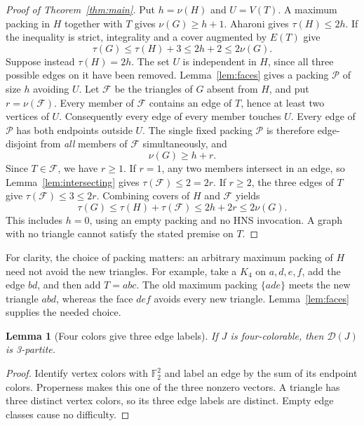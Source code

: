 \documentclass[11pt]{article}
\newtheorem{lemma}[theorem]{Lemma}
\theoremstyle{definition}\newtheorem{definition}[theorem]{Definition}
\theoremstyle{remark}\newtheorem{remark}[theorem]{Remark}
\newcommand{\D}{\mathcal D}
\begin{document}
\begin{proof}[Proof of Theorem~\ref{thm:main}]\leavevmode
Put $h=\nu(H)$ and $U=V(T)$. A maximum packing in $H$ together with
$T$ gives $\nu(G)\ge h+1$. Aharoni gives $\tau(H)\le2h$.
If the inequality is strict, integrality and a cover augmented by $E(T)$ give
\begin{equation}\label{eq:strict}
\tau(G)\le\tau(H)+3\le2h+2\le2\nu(G).
\end{equation}
Suppose instead $\tau(H)=2h$. The set $U$ is independent in $H$, since
all three possible edges on it have been removed. Lemma~\ref{lem:faces}
gives a packing $\mathcal P$ of size $h$ avoiding $U$.
Let $\mathcal F$ be the triangles of $G$ absent from $H$, and put
$r=\nu(\mathcal F)$. Every member of $\mathcal F$ contains an edge of
$T$, hence at least two vertices of $U$. Consequently every edge of
every member touches $U$. Every edge of $\mathcal P$ has both endpoints
outside $U$. The single fixed packing $\mathcal P$ is therefore
edge-disjoint from \emph{all} members of $\mathcal F$ simultaneously, and
\begin{equation}\label{eq:simultaneous}
\nu(G)\ge h+r.
\end{equation}
Since $T\in\mathcal F$, we have $r\ge1$. If $r=1$, any two members
intersect in an edge, so Lemma~\ref{lem:intersecting} gives
$\tau(\mathcal F)\le2=2r$. If $r\ge2$, the three edges of $T$ give
$\tau(\mathcal F)\le3\le2r$. Combining covers of $H$ and $\mathcal F$ yields
\begin{equation}\label{eq:equality}
\tau(G)\le\tau(H)+\tau(\mathcal F)\le2h+2r\le2\nu(G).
\end{equation}
This includes $h=0$, using an empty packing and no HNS invocation. A graph
with no triangle cannot satisfy the stated premise on $T$.
\end{proof}

For clarity, the choice of packing matters: an arbitrary maximum packing
of $H$ need not avoid the new triangles. For example, take a $K_4$ on
$a,d,e,f$, add the edge $bd$, and then add $T=abc$. The old maximum
packing $\{ade\}$ meets the new triangle $abd$, whereas the face $def$
avoids every new triangle. Lemma~\ref{lem:faces} supplies the needed choice.

\begin{lemma}[Four colors give three edge labels]\label{lem:colors}
If $J$ is four-colorable, then $\D(J)$ is 3-partite.
\end{lemma}
\begin{proof}\leavevmode
Identify vertex colors with $\mathbb F_2^2$ and label an edge by the
sum of its endpoint colors. Properness makes this one of the three
nonzero vectors. A triangle has three distinct vertex colors, so its
three edge labels are distinct. Empty edge classes cause no difficulty.
\end{proof}
\end{document}
